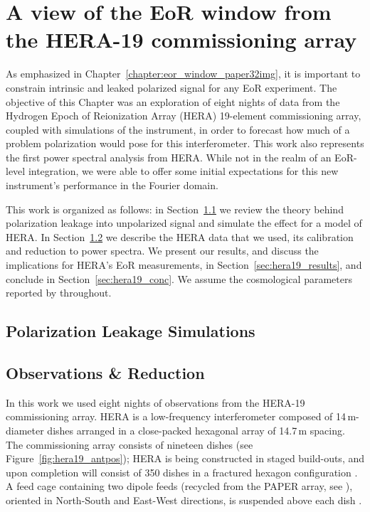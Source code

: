 \chapter{A view of the EoR window from the HERA-19 commissioning array}
\label{chapter:eor_window_HERA}

As emphasized in Chapter~\ref{chapter:eor_window_paper32img}, it is important to constrain intrinsic and leaked polarized signal for any EoR experiment. The objective of this Chapter was an exploration of eight nights of data from the Hydrogen Epoch of Reionization Array (HERA) 19-element commissioning array, coupled with simulations of the instrument, in order to forecast how much of a problem polarization would pose for this interferometer. 
This work also represents the first power spectral analysis from HERA. While not in the realm of an EoR-level integration, we were able to offer some initial expectations for this new instrument's performance in the Fourier domain.

This work is organized as follows: in Section~\ref{sec:hera19_leak} we review the theory behind polarization leakage into unpolarized signal and simulate the effect for a model of HERA. In Section~\ref{sec:hera19_obs} we describe the HERA data that we used, its calibration and reduction to power spectra. We present our results, and discuss the implications for HERA's EoR measurements, in Section~\ref{sec:hera19_results}, and conclude in Section~\ref{sec:hera19_conc}. We assume the cosmological parameters reported by \cite{Planck.16} throughout.

\section{Polarization Leakage Simulations}
\label{sec:hera19_leak}


\section{Observations \& Reduction}
\label{sec:hera19_obs}

In this work we used eight nights of observations from the HERA-19 commissioning array. HERA is a low-frequency interferometer composed of 14\,m-diameter dishes arranged in a close-packed hexagonal array of 14.7\,m spacing. The commissioning array consists of nineteen dishes (see Figure~\ref{fig:hera19_antpos}); HERA is being constructed in staged build-outs, and upon completion will consist of 350 dishes in a fractured hexagon configuration \citep[see][]{Dillon.16, deBoer.17}. A feed cage containing two dipole feeds (recycled from the PAPER array, see \citealt{Parsons.10}), oriented in North-South and East-West directions, is suspended above each dish \citep{Neben.16}.

